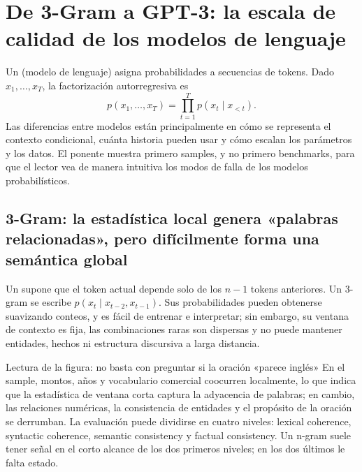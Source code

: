\section{De 3-Gram a GPT-3: la escala de calidad de los modelos de lenguaje}

Un  (modelo de lenguaje) asigna probabilidades a secuencias de tokens. Dado $x_1,\ldots,x_T$, la factorización autorregresiva es
\[
p(x_1,\ldots,x_T)=\prod_{t=1}^{T}p(x_t\mid x_{<t}).
\]
Las diferencias entre modelos están principalmente en cómo se representa el contexto condicional, cuánta historia pueden usar y cómo escalan los parámetros y los datos. El ponente muestra primero samples, y no primero benchmarks, para que el lector vea de manera intuitiva los modos de falla de los modelos probabilísticos.

\subsection{3-Gram: la estadística local genera «palabras relacionadas», pero difícilmente forma una semántica global}

Un  supone que el token actual depende solo de los $n-1$ tokens anteriores. Un 3-gram se escribe $p(x_t\mid x_{t-2},x_{t-1})$. Sus probabilidades pueden obtenerse suavizando conteos, y es fácil de entrenar e interpretar; sin embargo, su ventana de contexto es fija, las combinaciones raras son dispersas y no puede mantener entidades, hechos ni estructura discursiva a larga distancia.


\begin{knowledgebox}{Lectura de la figura: no basta con preguntar si la oración «parece inglés»}
En el sample, montos, años y vocabulario comercial coocurren localmente, lo que indica que la estadística de ventana corta captura la adyacencia de palabras; en cambio, las relaciones numéricas, la consistencia de entidades y el propósito de la oración se derrumban. La evaluación puede dividirse en cuatro niveles: lexical coherence, syntactic coherence, semantic consistency y factual consistency. Un n-gram suele tener señal en el corto alcance de los dos primeros niveles; en los dos últimos le falta estado.
\end{knowledgebox}

